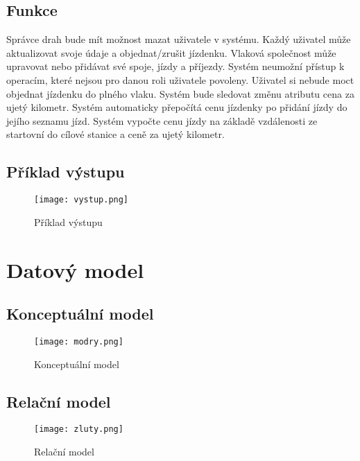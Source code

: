 \documentclass[11pt]{article}
\begin{document}
\subsection{Funkce}
Správce drah bude mít možnost mazat uživatele v systému. Každý uživatel může aktualizovat svoje údaje a objednat/zrušit jízdenku. Vlaková společnost může upravovat nebo přidávat své spoje, jízdy a příjezdy. Systém neumožní přístup k operacím, které nejsou pro danou roli uživatele povoleny. Uživatel si nebude moct objednat jízdenku do plného vlaku. Systém bude sledovat změnu atributu cena za ujetý kilometr. Systém automaticky přepočítá cenu jízdenky po přidání jízdy do jejího seznamu jízd. Systém vypočte cenu jízdy na základě vzdálenosti ze startovní do cílové stanice a ceně za ujetý kilometr.

\subsection{Příklad výstupu}
\begin{figure}[H]
    \texttt{[image: vystup.png]}
    \centering
    \caption{Příklad výstupu}
    \label{vystup}
\end{figure}

\newpage

\section{Datový model}

\subsection{Konceptuální model}
\begin{figure}[H]
    \texttt{[image: modry.png]}
    \centering
    \caption{Konceptuální model}
    \label{konceptualni}
\end{figure}

\subsection{Relační model}
\begin{figure}[H]
    \texttt{[image: zluty.png]}
    \centering
    \caption{Relační model}
    \label{relacni}
\end{figure}

\newpage
\end{document}
